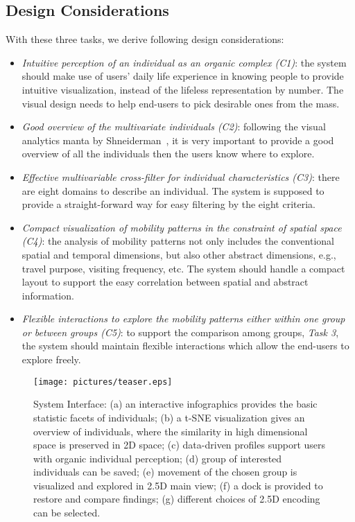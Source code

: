 \subsection{Design Considerations}

With these three tasks, we derive following design considerations:

\begin{itemize}
\item \textit{Intuitive perception of an individual as an organic complex (C1)}: the system should make use of users' daily life experience in knowing people to provide intuitive visualization, instead of the lifeless representation by number. The visual design needs to help end-users to pick desirable ones from the mass.
\item \textit{Good overview of the multivariate individuals (C2)}: following the visual analytics manta by Shneiderman~\citep{RN459}, it is very important to provide a good overview of all the individuals then the users know where to explore.
\item \textit{Effective multivariable cross-filter for individual characteristics (C3)}: there are eight domains to describe an individual. The system is supposed to provide a straight-forward way for easy filtering by the eight criteria.
\item \textit{Compact visualization of mobility patterns in the constraint of spatial space (C4)}: the analysis of mobility patterns not only includes the conventional spatial and temporal dimensions, but also other abstract dimensions, e.g., travel purpose, visiting frequency, etc. The system should handle a compact layout to support the easy correlation between spatial and abstract information.
\item \textit{Flexible interactions to explore the mobility patterns either within one group or between groups (C5)}: to support the comparison among groups, \textit{Task 3}, the system should maintain flexible interactions which allow the end-users to explore freely.
\end{itemize}


\begin{figure}[htb!]
 \centering %
 \texttt{[image: pictures/teaser.eps]}
 \caption{System Interface: (a) an interactive infographics provides the basic statistic facets of individuals; (b) a t-SNE visualization gives an overview of individuals, where the similarity in high dimensional space is preserved in 2D space; (c) data-driven profiles support users with organic individual perception; (d) group of interested individuals can be saved; (e) movement of the chosen group is visualized and explored in 2.5D main view; (f) a dock is provided to restore and compare findings; (g) different choices of 2.5D encoding can be selected.}
 \label{fig:teaser}
\end{figure}

